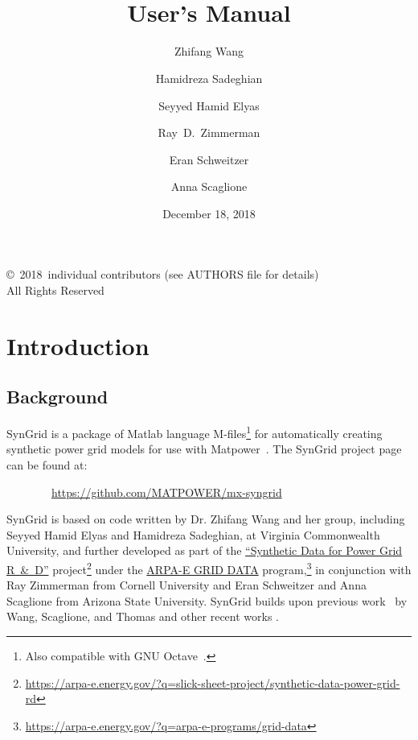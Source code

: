 \documentclass[12pt]{article}
\title{\syngrid{} \syngridver{}\\
User's Manual}
\author{Zhifang Wang \and Hamidreza Sadeghian \and Seyyed Hamid Elyas \and Ray~D.~Zimmerman \and Eran Schweitzer \and Anna Scaglione}
\date{December 18, 2018} %
\newcommand{\matlab}[0]{{\sc Matlab}}
\newcommand{\matpower}[0]{{\sc Matpower}}
\newcommand{\syngrid}[0]{{SynGrid}}
\newcommand{\syngridurl}[0]{https://github.com/MATPOWER/mx-syngrid}
\numberwithin{equation}{section}
\numberwithin{table}{section}
\numberwithin{figure}{section}
\begin{document}
\maketitle
\thispagestyle{empty}
\vfill
\begin{center}
{\scriptsize
\copyright~2018~individual contributors (see AUTHORS file for details)\\
All Rights Reserved}
\end{center}

\clearpage
\tableofcontents
\clearpage
\listoffigures
\listoftables

\clearpage
\section{Introduction}

\subsection{Background}

\syngrid{} is a package of \matlab{} language M-files\footnote{Also compatible with GNU Octave~\cite{octave}.} for automatically creating synthetic power grid models for use with \matpower{}~\cite{zimmerman2011,matpower,matpower_manual}. The \syngrid{} project page can be found at:

\bigskip

~~~~~~~~\url{\syngridurl}

\bigskip

\syngrid{} is based on code written by Dr. Zhifang Wang and her group, including Seyyed Hamid Elyas and Hamidreza Sadeghian, at Virginia Commonwealth University, and further developed as part of the \href{https://arpa-e.energy.gov/?q=slick-sheet-project/synthetic-data-power-grid-rd}{``Synthetic Data for Power Grid R~\&~D''} project\footnote{\url{https://arpa-e.energy.gov/?q=slick-sheet-project/synthetic-data-power-grid-rd}} under the \href{https://arpa-e.energy.gov/?q=arpa-e-programs/grid-data}{ARPA-E GRID DATA} program,\footnote{\url{https://arpa-e.energy.gov/?q=arpa-e-programs/grid-data}} in conjunction with Ray Zimmerman from Cornell University and Eran Schweitzer and Anna Scaglione from Arizona State University.
\syngrid{} builds upon previous work~\cite{wang2008, syngrid_nestedSW} by Wang, Scaglione, and Thomas and other recent works \cite{wang2015, syngrid_bustype, syngrid_scaling, syngrid_gen, syngrid_transmissionline, syngrid_stat, schweitzer2018mathematical}.
\end{document}
